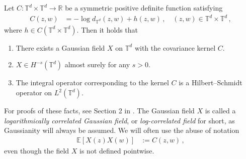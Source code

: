 \documentclass[11pt]{article}
\numberwithin{equation}{section}
\theoremstyle{definition}
\newcommand{\R}{\mathbb{R}}
\newcommand{\E}{\mathbb{E}}
\def\T{\mathbb{T}}
\begin{document}
Let $C: \T^d \times \T^d \to \R$ be a symmetric positive definite function satisfying
\begin{align}\label{eq:log-kernel}
C(z,w) &= - \log d_{\T^d}(z,w) + h(z,w)\,, \quad (z,w) \in \T^d \times \T^d\,,
\end{align}
where $h \in C(\T^d \times \T^d)$. Then it holds that
\begin{enumerate}
\item There exists a Gaussian field $X$ on $\T^d$ with the covariance kernel $C$.
\item $X \in H^{-s}(\T^d)$ almost surely for any $s > 0$.
\item The integral operator corresponding to the kernel $C$ is a Hilbert--Schmidt operator on $L^2(\T^d)$.
\end{enumerate}
For proofs of these facts, see Section 2 in \cite{JSW2}. The Gaussian field $X$ is called a \emph{logarithmically correlated Gaussian field}, or \emph{log-correlated field} for short, as Gaussianity will always be assumed. We will often use the abuse of notation
\begin{align*}
\E[X(z) X(w)] &:= C(z,w)\,,
\end{align*}
even though the field $X$ is not defined pointwise. 
\end{document}
